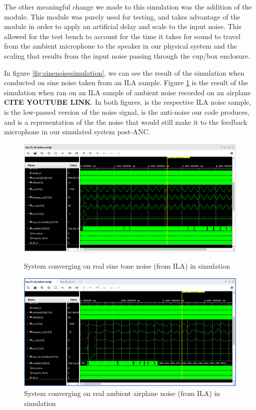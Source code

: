 \documentclass{fpgairpods}
\begin{document}
The other meaningful change we made to this simulation was the addition of the  module. This module was purely used for testing, and takes advantage of the  module in order to apply an artificial delay and scale to the input noise. This allowed for the test bench to account for the time it takes for sound to travel from the ambient microphone to the speaker in our physical system and the scaling that results from the input noise passing through the cup/box enclosure.

In figure \ref{fig:sinenoisesimulation}, we can see the result of the simulation when conducted on sine noise taken from an ILA sample. Figure \ref{fig:ambientnoisesimulation} is the result of the simulation when ran on an ILA sample of ambient noise recorded on an airplane \textbf{CITE YOUTUBE LINK}. In both figures,  is the respective ILA noise sample,  is the low-passed version of the noise signal,  is the anti-noise our code produces, and  is a representation of the the noise that would still make it to the feedback microphone in our simulated system post-ANC.

\begin{figure}
\centering
\includegraphics[width=450pt]{./figs/nlms_test_bench_sine_ila.png}
\caption{System converging on real sine tone noise (from ILA) in simulation}
\label{fig:sinenoisesimulation}

\bigskip
\includegraphics[width=450pt]{./figs/nlms_test_bench_plane_ila.png}
\caption{System converging on real ambient airplane noise (from ILA) in simulation}
\label{fig:ambientnoisesimulation}
\end{figure}
\end{document}
